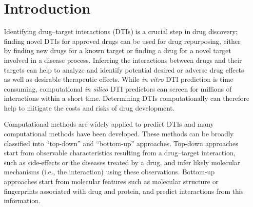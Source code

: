 \documentclass{bioinfo}
\begin{document}
\maketitle
\section{Introduction}



Identifying drug--target interactions (DTIs) is a crucial step in drug
discovery; finding novel DTIs for approved drugs can be used for drug
repurposing, either by finding new drugs for a known target or finding
a drug for a novel target involved in a disease process.  Inferring
the interactions between drugs and their targets can help to analyze
and identify potential desired or adverse drug effects as well as
desirable therapeutic effects. While \textit{in vitro} DTI prediction
is time consuming, computational \textit{in silico} DTI predictors can
screen for millions of interactions within a short time.  Determining
DTIs computationally can therefore help to mitigate the costs and
risks of drug development.

Computational methods are widely applied to predict DTIs and many
computational methods have been developed.  These methods can be
broadly classified into ``top-down'' and ``bottom-up''
approaches. Top-down approaches start from observable characteristics
resulting from a drug--target interaction, such as side-effects or the
diseases treated by a drug, and infer likely molecular mechanisms
(i.e., the interaction) using these observations.
Bottom-up approaches start from molecular features such as molecular
structure or fingerprints associated with drug and protein, and
predict interactions from this information.
\end{document}
